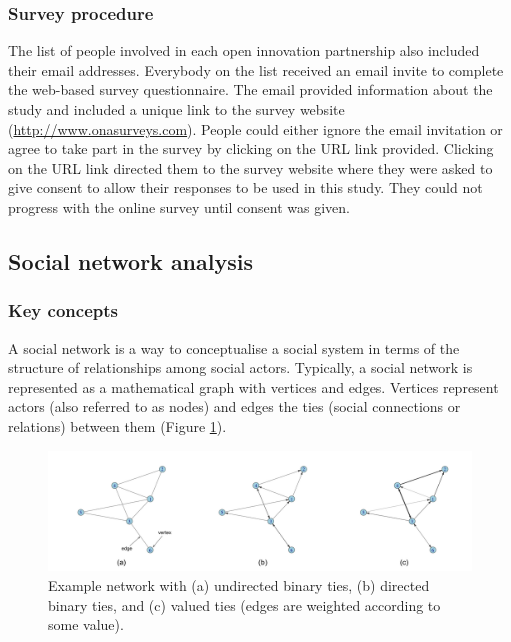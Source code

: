 \subsubsection{Survey procedure}

The list of people involved in each open innovation partnership also included their email addresses. Everybody on the list received an email invite to complete the web-based survey questionnaire. The email provided information about the study and included a unique link to the survey website (\url{http://www.onasurveys.com}). People could either ignore the email invitation or agree to take part in the survey by clicking on the URL link provided. Clicking on the URL link directed them to the survey website where they were asked to give consent to allow their responses to be used in this study. They could not progress with the online survey until consent was given.

\subsection{Social network analysis}

\subsubsection{Key concepts}

A social network is a way to conceptualise a social system in terms of the structure of relationships among social actors. Typically, a social network is represented as a mathematical graph with vertices and edges. Vertices represent actors (also referred to as nodes) and edges the ties (social connections or relations) between them (Figure \ref{fig:examples}). \medskip

\begin{figure}[hbt!]
    \centering
    \includegraphics[width=1.0\linewidth]{Images/example_networks.png}
    \caption[Examples of directed, undirected and valued networks]{Example network with (a) undirected binary ties, (b) directed binary ties, and (c) valued ties (edges are weighted according to some value).}
    \label{fig:examples}
\end{figure}

